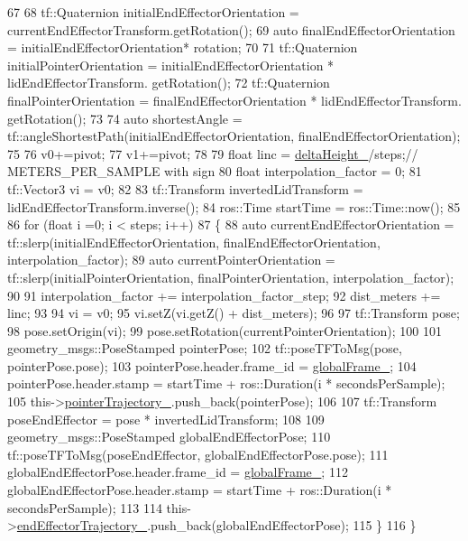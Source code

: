 \begin{DoxyCode}
67 
68         tf::Quaternion initialEndEffectorOrientation = currentEndEffectorTransform.getRotation();
69         \textcolor{keyword}{auto} finalEndEffectorOrientation = initialEndEffectorOrientation* rotation;
70 
71         tf::Quaternion initialPointerOrientation = initialEndEffectorOrientation * lidEndEffectorTransform.
      getRotation();
72         tf::Quaternion finalPointerOrientation = finalEndEffectorOrientation * lidEndEffectorTransform.
      getRotation();
73 
74         \textcolor{keyword}{auto} shortestAngle = tf::angleShortestPath(initialEndEffectorOrientation, 
      finalEndEffectorOrientation);
75 
76         v0+=pivot;
77         v1+=pivot;
78 
79         \textcolor{keywordtype}{float} linc = \hyperlink{classcl__move__group__interface_1_1CbCircularPouringMotion_a7009d617bcd8ac1fba49100444434f3c}{deltaHeight\_}/steps;\textcolor{comment}{// METERS\_PER\_SAMPLE with sign}
80         \textcolor{keywordtype}{float} interpolation\_factor = 0;
81         tf::Vector3 vi = v0;
82 
83         tf::Transform invertedLidTransform = lidEndEffectorTransform.inverse();
84         ros::Time startTime = ros::Time::now();
85 
86         \textcolor{keywordflow}{for} (\textcolor{keywordtype}{float} i =0; i < steps; i++)
87         \{
88             \textcolor{keyword}{auto} currentEndEffectorOrientation = tf::slerp(initialEndEffectorOrientation, 
      finalEndEffectorOrientation, interpolation\_factor);
89             \textcolor{keyword}{auto} currentPointerOrientation = tf::slerp(initialPointerOrientation, finalPointerOrientation, 
      interpolation\_factor);
90 
91             interpolation\_factor += interpolation\_factor\_step;
92             dist\_meters += linc;
93 
94             vi = v0;
95             vi.setZ(vi.getZ() + dist\_meters);
96 
97             tf::Transform pose;
98             pose.setOrigin(vi);
99             pose.setRotation(currentPointerOrientation);
100 
101             geometry\_msgs::PoseStamped pointerPose;
102             tf::poseTFToMsg(pose, pointerPose.pose);
103             pointerPose.header.frame\_id = \hyperlink{classcl__move__group__interface_1_1CbCircularPouringMotion_a1d54253dc370bce8dd413e08b4bf8c43}{globalFrame\_};
104             pointerPose.header.stamp = startTime + ros::Duration(i * secondsPerSample);
105             this->\hyperlink{classcl__move__group__interface_1_1CbCircularPouringMotion_a6f53442c47cf9280d8be72ea1c35546f}{pointerTrajectory\_}.push\_back(pointerPose);
106 
107             tf::Transform poseEndEffector = pose * invertedLidTransform;
108 
109             geometry\_msgs::PoseStamped globalEndEffectorPose;
110             tf::poseTFToMsg(poseEndEffector, globalEndEffectorPose.pose);
111             globalEndEffectorPose.header.frame\_id = \hyperlink{classcl__move__group__interface_1_1CbCircularPouringMotion_a1d54253dc370bce8dd413e08b4bf8c43}{globalFrame\_};
112             globalEndEffectorPose.header.stamp = startTime + ros::Duration(i * secondsPerSample);
113 
114             this->\hyperlink{classcl__move__group__interface_1_1CbMoveEndEffectorTrajectory_ae13dfd31ea3660646e03882f0c2c29f0}{endEffectorTrajectory\_}.push\_back(globalEndEffectorPose);
115         \}
116     \}
\end{DoxyCode}
